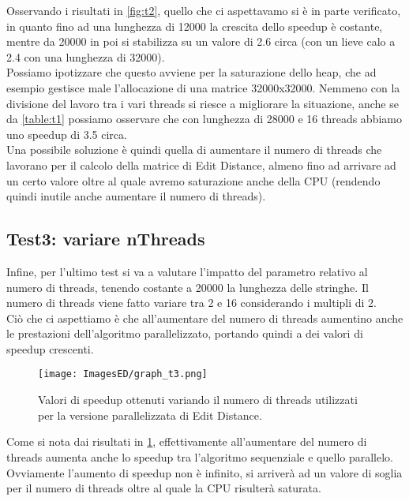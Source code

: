 \documentclass[10pt,twocolumn,letterpaper]{article}
\begin{document}
Osservando i risultati in \cref{fig:t2}, quello che ci aspettavamo si è in parte verificato, in quanto fino ad una lunghezza di 12000 la crescita dello speedup è costante, mentre da 20000 in poi si stabilizza su un valore di 2.6 circa (con un lieve calo a 2.4 con una lunghezza di 32000).\\
Possiamo ipotizzare che questo avviene per la saturazione dello heap, che ad esempio gestisce male l'allocazione di una matrice 32000x32000. Nemmeno con la divisione del lavoro tra i vari threads si riesce a migliorare la situazione, anche se da \cref{table:t1} possiamo osservare che con lunghezza di 28000 e 16 threads abbiamo uno speedup di 3.5 circa.\\
Una possibile soluzione è quindi quella di aumentare il numero di threads che lavorano per il calcolo della matrice di Edit Distance, almeno fino ad arrivare ad un certo valore oltre al quale avremo saturazione anche della CPU (rendendo quindi inutile anche aumentare il numero di threads).

\subsection{Test3: variare nThreads}
Infine, per l'ultimo test si va a valutare l'impatto del parametro relativo al numero di threads, tenendo costante a 20000 la lunghezza delle stringhe.
Il numero di threads viene fatto variare tra 2 e 16 considerando i multipli di 2.\\
Ciò che ci aspettiamo è che all'aumentare del numero di threads aumentino anche le prestazioni dell'algoritmo parallelizzato, portando quindi a dei valori di speedup crescenti.

\begin{figure}[h]
    \centering
    \texttt{[image: ImagesED/graph\_t3.png]}
    \caption{Valori di speedup ottenuti variando il numero di threads utilizzati per la versione parallelizzata di Edit Distance.}
    \label{fig:t3}
\end{figure}

Come si nota dai risultati in \cref{fig:t3}, effettivamente all'aumentare del numero di threads aumenta anche lo speedup tra l'algoritmo sequenziale e quello parallelo. Ovviamente l'aumento di speedup non è infinito, si arriverà ad un valore di soglia per il numero di threads oltre al quale la CPU risulterà saturata.
\end{document}
